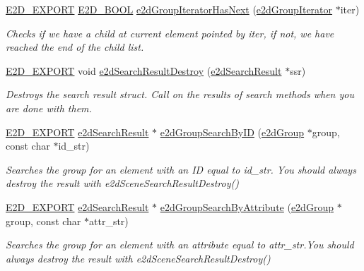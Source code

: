 \begin{DoxyCompactItemize}
\hyperlink{Ez2DS_8h_a9f14e9cb869e1a85fdaba03afcca0df9}{E2\-D\-\_\-\-E\-X\-P\-O\-R\-T} \hyperlink{Ez2DS_8h_aac8cdc3a3bcd6b56a8c3e0bb6979cbf8}{E2\-D\-\_\-\-B\-O\-O\-L} \hyperlink{group__e2dGroup_ga2e74310ea432fa45cea8b03da8fc29ef}{e2d\-Group\-Iterator\-Has\-Next} (\hyperlink{structe2dGroupIterator}{e2d\-Group\-Iterator} $\ast$iter)
\begin{DoxyCompactList}\small\item\em Checks if we have a child at current element pointed by iter, if not, we have reached the end of the child list. \end{DoxyCompactList}\item 
\hypertarget{group__e2dGroup_ga0775c9a7e2ec5311263f84339afb52bc}{\hyperlink{Ez2DS_8h_a9f14e9cb869e1a85fdaba03afcca0df9}{E2\-D\-\_\-\-E\-X\-P\-O\-R\-T} void \hyperlink{group__e2dGroup_ga0775c9a7e2ec5311263f84339afb52bc}{e2d\-Search\-Result\-Destroy} (\hyperlink{structe2dSearchResult}{e2d\-Search\-Result} $\ast$ssr)}\label{group__e2dGroup_ga0775c9a7e2ec5311263f84339afb52bc}

\begin{DoxyCompactList}\small\item\em Destroys the search result struct. Call on the results of search methods when you are done with them. \end{DoxyCompactList}\item 
\hyperlink{Ez2DS_8h_a9f14e9cb869e1a85fdaba03afcca0df9}{E2\-D\-\_\-\-E\-X\-P\-O\-R\-T} \hyperlink{structe2dSearchResult}{e2d\-Search\-Result} $\ast$ \hyperlink{group__e2dGroup_ga0c495948b5e2e14d004d1daacf4811af}{e2d\-Group\-Search\-By\-I\-D} (\hyperlink{structe2dGroup}{e2d\-Group} $\ast$group, const char $\ast$id\-\_\-str)
\begin{DoxyCompactList}\small\item\em Searches the group for an element with an I\-D equal to id\-\_\-str. You should always destroy the result with e2d\-Scene\-Search\-Result\-Destroy() \end{DoxyCompactList}\item 
\hyperlink{Ez2DS_8h_a9f14e9cb869e1a85fdaba03afcca0df9}{E2\-D\-\_\-\-E\-X\-P\-O\-R\-T} \hyperlink{structe2dSearchResult}{e2d\-Search\-Result} $\ast$ \hyperlink{group__e2dGroup_gab4ce5d4021112416fecd57eea234dfc9}{e2d\-Group\-Search\-By\-Attribute} (\hyperlink{structe2dGroup}{e2d\-Group} $\ast$group, const char $\ast$attr\-\_\-str)
\begin{DoxyCompactList}\small\item\em Searches the group for an element with an attribute equal to attr\-\_\-str.\-You should always destroy the result with e2d\-Scene\-Search\-Result\-Destroy() \end{DoxyCompactList}\end{DoxyCompactItemize}


